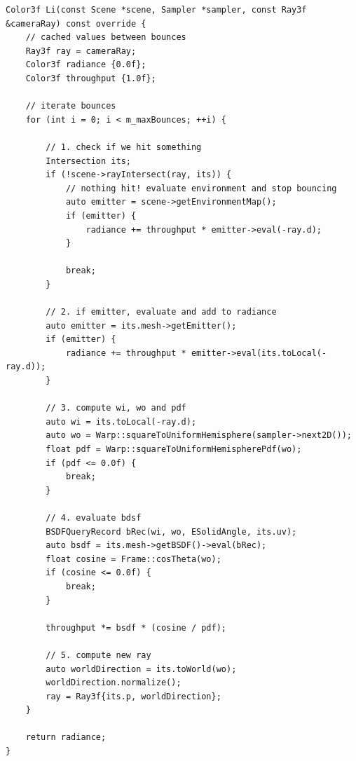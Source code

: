 \begin{lstlisting}[caption={\code{SimplePathIntegrator::Li}},label={lst:simple-path-integrator}]
Color3f Li(const Scene *scene, Sampler *sampler, const Ray3f &cameraRay) const override {
    // cached values between bounces
    Ray3f ray = cameraRay;
    Color3f radiance {0.0f};
    Color3f throughput {1.0f};
    
    // iterate bounces
    for (int i = 0; i < m_maxBounces; ++i) {
        
        // 1. check if we hit something
        Intersection its;
        if (!scene->rayIntersect(ray, its)) {
            // nothing hit! evaluate environment and stop bouncing
            auto emitter = scene->getEnvironmentMap();
            if (emitter) {
                radiance += throughput * emitter->eval(-ray.d);
            }
            
            break;
        }
        
        // 2. if emitter, evaluate and add to radiance
        auto emitter = its.mesh->getEmitter();
        if (emitter) {
            radiance += throughput * emitter->eval(its.toLocal(-ray.d));
        }
        
        // 3. compute wi, wo and pdf
        auto wi = its.toLocal(-ray.d);
        auto wo = Warp::squareToUniformHemisphere(sampler->next2D());
        float pdf = Warp::squareToUniformHemispherePdf(wo);
        if (pdf <= 0.0f) {
            break;
        }
        
        // 4. evaluate bdsf
        BSDFQueryRecord bRec(wi, wo, ESolidAngle, its.uv);
        auto bsdf = its.mesh->getBSDF()->eval(bRec);
        float cosine = Frame::cosTheta(wo);
        if (cosine <= 0.0f) {
            break;
        }
        
        throughput *= bsdf * (cosine / pdf);
        
        // 5. compute new ray
        auto worldDirection = its.toWorld(wo);
        worldDirection.normalize();
        ray = Ray3f{its.p, worldDirection};
    }
    
    return radiance;
}
\end{lstlisting}